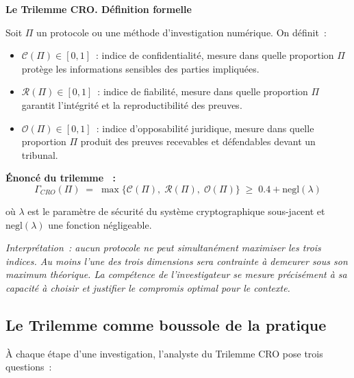 \begin{boxCRO}
\textbf{Le Trilemme CRO. Définition formelle}

\medskip
Soit $\Pi$ un protocole ou une méthode d'investigation numérique. On définit~:
\begin{itemize}
    \item $\mathcal{C}(\Pi) \in [0,1]$~: indice de confidentialité,
          mesure dans quelle proportion $\Pi$ protège les informations
          sensibles des parties impliquées.
    \item $\mathcal{R}(\Pi) \in [0,1]$~: indice de fiabilité,
          mesure dans quelle proportion $\Pi$ garantit l'intégrité et
          la reproductibilité des preuves.
    \item $\mathcal{O}(\Pi) \in [0,1]$~: indice d'opposabilité juridique,
          mesure dans quelle proportion $\Pi$ produit des preuves
          recevables et défendables devant un tribunal.
\end{itemize}

\textbf{Énoncé du trilemme \cite{minka2025cro}~:}
\begin{equation}
\Gamma_{CRO}(\Pi) \;=\; \max\bigl\{\mathcal{C}(\Pi),\;
\mathcal{R}(\Pi),\; \mathcal{O}(\Pi)\bigr\}
\;\geq\; 0.4 + \mathrm{negl}(\lambda)
\label{eq:CRO}
\end{equation}

où $\lambda$ est le paramètre de sécurité du système cryptographique sous-jacent
et $\mathrm{negl}(\lambda)$ une fonction négligeable.

\medskip
\textit{Interprétation~: aucun protocole ne peut simultanément maximiser
les trois indices. Au moins l'une des trois dimensions sera contrainte à
demeurer sous son maximum théorique. La compétence de l'investigateur
se mesure précisément à sa capacité à choisir et justifier
le compromis optimal pour le contexte.}
\end{boxCRO}

\subsection{Le Trilemme comme boussole de la pratique}

À chaque étape d'une investigation, l'analyste du Trilemme CRO pose
trois questions~:

